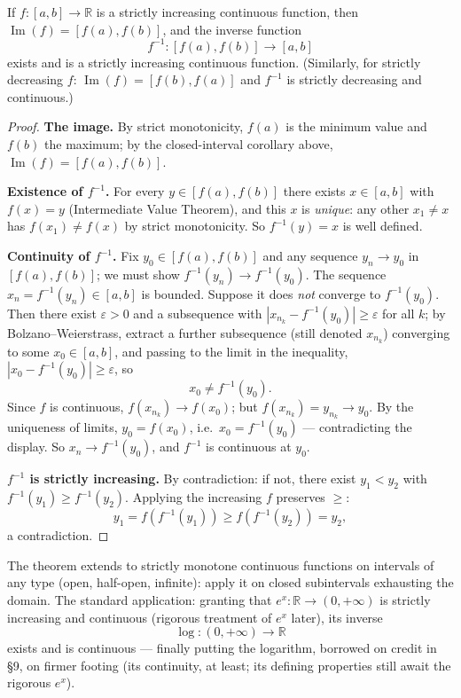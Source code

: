 \documentclass[11pt]{report}
\begin{document}
\begin{thmbox}
If $f: [a,b] \to \mathbb{R}$ is a strictly increasing continuous function, then $\operatorname{Im}(f) = [f(a), f(b)]$, and the inverse function
\[
f^{-1}: [f(a), f(b)] \to [a,b]
\]
exists and is a strictly increasing continuous function. (Similarly, for strictly decreasing $f$: $\operatorname{Im}(f) = [f(b), f(a)]$ and $f^{-1}$ is strictly decreasing and continuous.)
\end{thmbox}

\begin{proof}
\textbf{The image.} By strict monotonicity, $f(a)$ is the minimum value and $f(b)$ the maximum; by the closed-interval corollary above, $\operatorname{Im}(f) = [f(a), f(b)]$.

\textbf{Existence of $f^{-1}$.} For every $y \in [f(a), f(b)]$ there exists $x \in [a,b]$ with $f(x) = y$ (Intermediate Value Theorem), and this $x$ is \emph{unique}: any other $x_1 \neq x$ has $f(x_1) \neq f(x)$ by strict monotonicity. So $f^{-1}(y) = x$ is well defined.

\textbf{Continuity of $f^{-1}$.} Fix $y_0 \in [f(a), f(b)]$ and any sequence $y_n \to y_0$ in $[f(a), f(b)]$; we must show $f^{-1}(y_n) \to f^{-1}(y_0)$. The sequence $x_n = f^{-1}(y_n) \in [a,b]$ is bounded. Suppose it does \emph{not} converge to $f^{-1}(y_0)$. Then there exist $\varepsilon > 0$ and a subsequence with $|x_{n_k} - f^{-1}(y_0)| \geq \varepsilon$ for all $k$; by Bolzano--Weierstrass, extract a further subsequence (still denoted $x_{n_k}$) converging to some $x_0 \in [a,b]$, and passing to the limit in the inequality, $|x_0 - f^{-1}(y_0)| \geq \varepsilon$, so
\[
x_0 \neq f^{-1}(y_0).
\]
Since $f$ is continuous, $f(x_{n_k}) \to f(x_0)$; but $f(x_{n_k}) = y_{n_k} \to y_0$. By the uniqueness of limits, $y_0 = f(x_0)$, i.e.\ $x_0 = f^{-1}(y_0)$ --- contradicting the display. So $x_n \to f^{-1}(y_0)$, and $f^{-1}$ is continuous at $y_0$.

\textbf{$f^{-1}$ is strictly increasing.} By contradiction: if not, there exist $y_1 < y_2$ with $f^{-1}(y_1) \geq f^{-1}(y_2)$. Applying the increasing $f$ preserves $\geq$:
\[
y_1 = f(f^{-1}(y_1)) \geq f(f^{-1}(y_2)) = y_2,
\]
a contradiction.
\end{proof}

\begin{rembox}
The theorem extends to strictly monotone continuous functions on intervals of any type (open, half-open, infinite): apply it on closed subintervals exhausting the domain. The standard application: granting that $e^x: \mathbb{R} \to (0, +\infty)$ is strictly increasing and continuous (rigorous treatment of $e^x$ later), its inverse
\[
\log: (0, +\infty) \to \mathbb{R}
\]
exists and is continuous --- finally putting the logarithm, borrowed on credit in \S 9, on firmer footing (its continuity, at least; its defining properties still await the rigorous $e^x$).
\end{rembox}
\end{document}
